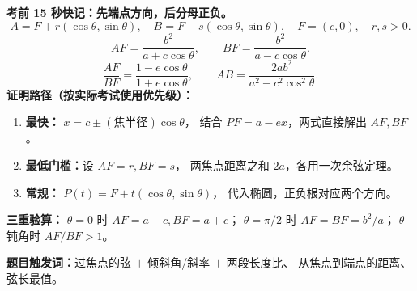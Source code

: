 \clearpage
\begin{summarybox}
\textbf{考前 15 秒快记：先端点方向，后分母正负。}
\[
 A=F+r(\cos\theta,\sin\theta),\quad
 B=F-s(\cos\theta,\sin\theta),\quad F=(c,0),\quad r,s>0.
\]
\[
 \boxed{AF=\frac{b^2}{a+c\cos\theta}},\qquad
 \boxed{BF=\frac{b^2}{a-c\cos\theta}}.
\]
\[
 \boxed{\frac{AF}{BF}=\frac{1-e\cos\theta}{1+e\cos\theta}},\qquad
 \boxed{AB=\frac{2ab^2}{a^2-c^2\cos^2\theta}}.
\]
\textbf{证明路径（按实际考试使用优先级）：}
\begin{enumerate}
 \item \textbf{最快：} $x=c\pm(\text{焦半径})\cos\theta$，
 结合 $PF=a-ex$，两式直接解出 $AF,BF$。
 \item \textbf{最低门槛：}设 $AF=r,BF=s$，
 两焦点距离之和 $2a$，各用一次余弦定理。
 \item \textbf{常规：} $P(t)=F+t(\cos\theta,\sin\theta)$，
 代入椭圆，正负根对应两个方向。
\end{enumerate}
\textbf{三重验算：}
$\theta=0$ 时 $AF=a-c,BF=a+c$；
$\theta=\pi/2$ 时 $AF=BF=b^2/a$；
$\theta$ 钝角时 $AF/BF>1$。
\par\smallskip\noindent
\textbf{题目触发词：}过焦点的弦 $+$ 倾斜角/斜率 $+$ 两段长度比、
从焦点到端点的距离、弦长最值。
\end{summarybox}
